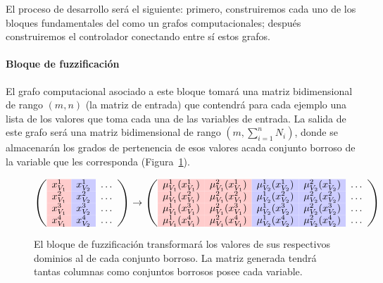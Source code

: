 El proceso de desarrollo será el siguiente: primero, construiremos cada uno de los bloques fundamentales del  como un grafos computacionales; después construiremos el controlador conectando entre sí estos grafos.

\paragraph{Bloque de fuzzificación}

El grafo computacional asociado a este bloque tomará una matriz bidimensional de rango $(m, n)$ (la matriz de entrada) que contendrá para cada ejemplo una lista de los valores que toma cada una de las variables de entrada. La salida de este grafo será una matriz bidimensional de rango $(m, \sum_{i=1}^n N_i)$, donde se almacenarán los grados de pertenencia de esos valores acada conjunto borroso de la variable que les corresponda (Figura~\ref{fig:input-to-fuzzy-input}).

\begin{figure}
	\centering
	\small
	\begin{equation*}
	\left(\begin{array}{>{\columncolor{red!20}}c>{\columncolor{blue!20}}cc}
	x^1_{V_1} & x^1_{V_2} & \ldots \\
	x^2_{V_1} & x^2_{V_2} & \ldots \\
	x^3_{V_1} & x^3_{V_2} & \ldots \\
	x^4_{V_1} & x^4_{V_2} & \ldots \\
	\end{array}\right)
	\rightarrow
	\left(\begin{array}{>{\columncolor{red!20}}c>{\columncolor{red!20}}c>{\columncolor{blue!20}}c>{\columncolor{blue!20}}cc}
	\mu^1_{V_1}(x^1_{V_1}) & \mu^2_{V_1}(x^1_{V_1}) & \mu^1_{V_2}(x^1_{V_2}) & \mu^2_{V_2}(x^1_{V_2}) & \ldots \\
	\mu^1_{V_1}(x^2_{V_1}) & \mu^2_{V_1}(x^2_{V_1}) & \mu^1_{V_2}(x^2_{V_2}) & \mu^2_{V_2}(x^2_{V_2}) & \ldots \\
	\mu^1_{V_1}(x^3_{V_1}) & \mu^2_{V_1}(x^3_{V_1}) & \mu^1_{V_2}(x^3_{V_2}) & \mu^2_{V_2}(x^3_{V_2}) & \ldots \\
	\mu^1_{V_1}(x^4_{V_1}) & \mu^2_{V_1}(x^4_{V_1}) & \mu^1_{V_2}(x^4_{V_2}) & \mu^2_{V_2}(x^4_{V_2}) & \ldots \\
	\end{array}\right)
	\end{equation*}
	\caption[Ejemplo de operación en el bloque de fuzzificación]{El bloque de fuzzificación transformará los valores de sus respectivos dominios al de cada conjunto borroso. La matriz generada tendrá tantas columnas como conjuntos borrosos posee cada variable.}
	\label{fig:input-to-fuzzy-input}
\end{figure}

